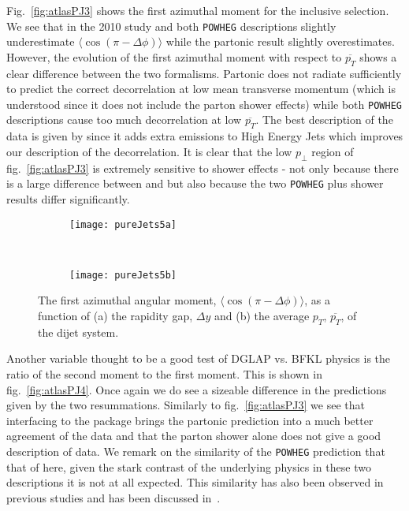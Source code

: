 	Fig.~\eqref{fig:atlasPJ3} shows the first azimuthal moment for the inclusive selection.
	We see that in the 2010 study \HEJA and both \texttt{POWHEG} descriptions slightly
	underestimate $\langle\cos(\pi-\Delta\phi)\rangle$ while the partonic \HEJ result slightly
	overestimates.  However, the evolution of the first azimuthal moment with respect to
	$\overline{p_T}$ shows a clear difference between the two formalisms.  Partonic \HEJ does not
	radiate sufficiently to predict the correct decorrelation at low mean transverse momentum
	(which is understood since it does not include the parton shower effects) while both
	\texttt{POWHEG} descriptions cause too much decorrelation at low $\overline{p_T}$.
	The best description of the data is given by \HEJA since it adds extra emissions to High
	Energy Jets which improves our description of the decorrelation.  It is clear that the low
	$p_\perp$ region of fig.~\eqref{fig:atlasPJ3} is extremely sensitive to shower effects - not
	only because there is a large difference between \HEJ and \HEJA but also because the two
	\texttt{POWHEG} plus shower results differ significantly.

	\begin{figure}[bth]
		\centering
		\begin{subfigure}[b]{0.48\textwidth}
			\texttt{[image: pureJets5a]}
			\caption{}
			\label{fig:}
		\end{subfigure}
		~
		\begin{subfigure}[b]{0.48\textwidth}
			\texttt{[image: pureJets5b]}
			\caption{}
			\label{fig:}
		\end{subfigure}
		\caption{The first azimuthal angular moment, $\langle \cos(\pi-\Delta\phi)\rangle$,
		as a function of (a) the rapidity gap, $\Delta y$ and (b) the average $p_T$,
		$\overline{p_T}$, of the dijet system.}
		\label{fig:atlasPJ3}
	\end{figure}

	Another variable thought to be a good test of DGLAP vs. BFKL physics is the ratio of
	the second moment to the first moment.  This is shown in fig.~\eqref{fig:atlasPJ4}.  Once
	again we do see a sizeable difference in the predictions given by the two resummations.
	Similarly to fig.~\eqref{fig:atlasPJ3} we see that interfacing to the \ARIADNE package
	brings the partonic \HEJ prediction into a much better agreement of the data and that the
	parton shower alone does not give a good description of data.  We remark on the similarity
	of the \texttt{POWHEG} prediction that that of \HEJA here, given the stark contrast of the
	underlying physics in these two descriptions it is not at all expected.  This similarity
	has also been observed in previous studies and has been discussed in~\cite{Alioli:2012tp}.

